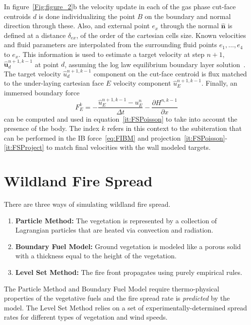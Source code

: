\documentclass[journal,article,atmosphere,submit,moreauthors,pdftex]{Definitions/mdpi}
\begin{document}
In figure~\ref{Fig:figure_2}b the velocity update in each of the gas phase cut-face centroids $d$ is done individualizing the point $B$ on the boundary and normal direction through these. Also, and external point $e_x$ through the normal $\mathbf{\hat{n}}$ is defined at a distance $\delta_{ex}$, of the order of the cartesian cells size. Known velocities and fluid parameters are interpolated from the surrounding fluid points $e_1,\dots,e_4$ to $e_x$. 
This information is used to estimate a target velocity at step $n+1$, $\mathbf{\hat{u}}_d^{n+1,k-1}$ at point $d$, assuming the log law equilibrium boundary layer solution~\cite{mcgratta_2013}. The target velocity $\hat{u}_d^{n+1,k-1}$ component on the cut-face centroid is flux matched to the under-laying cartesian face $E$ velocity component $\hat{u}_E^{n+1,k-1}$. Finally, an immersed boundary force 
%
\begin{equation}
F_E^k=-\frac{\hat{u}_E^{n+1,k-1}-u_E^{n}}{\Delta t} - \frac{\partial H^{n,k-1}}{\partial x}
\label{eq:FIBM}
\end{equation}
%
can be computed and used in equation~\eqref{it:FSPoisson} to take into account the presence of the body. The index $k$ refers in this context to the subiteration that can be performed in the IB force~\eqref{eq:FIBM} and projection~\eqref{it:FSPoisson}-\eqref{it:FSProject} to match final velocities with the wall modeled targets.


\section{Wildland Fire Spread} \label{sec:firespread}

There are three ways of simulating wildland fire spread.

\begin{enumerate}
\item {\bf Particle Method:} The vegetation is represented by a collection of Lagrangian particles that are heated via convection and radiation.
\item {\bf Boundary Fuel Model:} Ground vegetation is modeled like a porous solid with a thickness equal to the height of the vegetation.
\item {\bf Level Set Method:} The fire front propagates using purely empirical rules.
\end{enumerate}
The Particle Method and Boundary Fuel Model require thermo-physical properties of the vegetative fuels and the fire spread rate is {\em predicted} by the model. The Level Set Method relies on a set of experimentally-determined spread rates for different types of vegetation and wind speeds.
\end{document}
